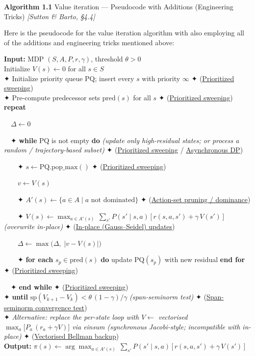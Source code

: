 \documentclass[11pt]{article}
\begin{document}
    \begin{pseudobox}

\textbf{Algorithm 1.1} Value iteration --- Pseudocode with Additions
(Engineering Tricks) \emph{{[}Sutton \& Barto, §4.4{]}}

\tcbline

Here is the pseudocode for the value iteration algorithm with also
employing all of the additions and engineering tricks mentioned above:

\textbf{Input:} MDP \((S, A, P, r, \gamma)\), threshold \(\theta > 0\)\\
Initialize \(V(s) \leftarrow 0\) for all \(s \in S\)\\
✦ Initialize priority queue \(\mathrm{PQ}\); insert every \(s\) with
priority \(\infty\) ✦ (\hyperref[trick-1-1-2]{Prioritized sweeping})\\
✦ Pre-compute predecessor sets \(\mathrm{pred}(s)\) for all \(s\) ✦
(\hyperref[trick-1-1-2]{Prioritized sweeping})\\
\textbf{repeat}\\
\strut ~~\(\Delta \leftarrow 0\)\\
\strut ~~✦ \textbf{while} \(\mathrm{PQ}\) is not empty \textbf{do}
\emph{(update only high-residual states; or process a random /
trajectory-based subset)} ✦ (\hyperref[trick-1-1-2]{Prioritized
sweeping} / \hyperref[trick-1-1-3]{Asynchronous DP})\\
\strut ~~~~✦ \(s \leftarrow \mathrm{PQ.pop\_max}()\) ✦
(\hyperref[trick-1-1-2]{Prioritized sweeping})\\
\strut ~~~~\(v \leftarrow V(s)\)\\
\strut ~~~~✦
\(A'(s) \leftarrow \{a \in A \mid a \text{ not dominated}\}\) ✦
(\hyperref[trick-1-1-6]{Action-set pruning / dominance})\\
\strut ~~~~✦
\(V(s) \leftarrow \max_{a \in A'(s)}\, \sum_{s'} P(s' \mid s, a)\,\bigl[\, r(s, a, s') + \gamma\, V(s') \,\bigr]\)
\emph{(overwrite in-place)} ✦ (\hyperref[trick-1-1-1]{In-place
(Gauss--Seidel) updates})\\
\strut ~~~~\(\Delta \leftarrow \max\!\bigl(\Delta,\; |v - V(s)|\bigr)\)\\
\strut ~~~~✦ \textbf{for each} \(s_p \in \mathrm{pred}(s)\) \textbf{do}
update \(\mathrm{PQ}(s_p)\) with new residual \textbf{end for} ✦
(\hyperref[trick-1-1-2]{Prioritized sweeping})\\
\strut ~~✦ \textbf{end while} ✦ (\hyperref[trick-1-1-2]{Prioritized
sweeping})\\
✦ \textbf{until}
\(\mathrm{sp}(V_{k+1} - V_k) < \theta\,(1-\gamma)/\gamma\)
\emph{(span-seminorm test)} ✦ (\hyperref[trick-1-1-5]{Span-seminorm
convergence test})\\
✦ \emph{Alternative: replace the per-state loop with \(V \leftarrow\)
vectorised \(\max_a\bigl[P_a\,(r_a + \gamma V)\bigr]\) via einsum
(synchronous Jacobi-style; incompatible with in-place)} ✦
(\hyperref[trick-1-1-4]{Vectorised Bellman backup})\\
\textbf{Output:}
\(\pi(s) \leftarrow \arg\max_{a \in A'(s)}\, \sum_{s'} P(s' \mid s, a)\,\bigl[\, r(s, a, s') + \gamma\, V(s') \,\bigr]\)

\end{pseudobox}
\end{document}
